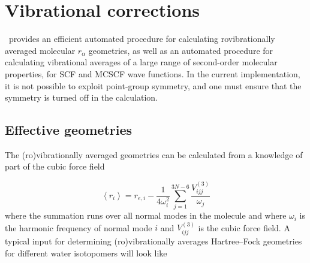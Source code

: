 \chapter{Vibrational corrections}\label{ch:vibave}

\siraba\ provides an efficient automated procedure for calculating
rovibrationally averaged molecular $r_\alpha$ geometries, as well as an
automated procedure for calculating vibrational averages of a large
range of second-order molecular properties, for SCF and MCSCF wave
functions. In the current implementation, it is not possible to
exploit point-group symmetry, and one must ensure that the symmetry is
turned off in the calculation.

\begin{center}
\end{center}

\section{Effective geometries}\label{sec:effgeom}

The (ro)vibrationally averaged geometries can be
calculated from a knowledge of part of the cubic force field

\begin{equation}
\left<r_i\right> = r_{e,i} -
\frac{1}{4\omega_i^2}\sum_{j=1}^{3N-6}\frac{V^{\left(3\right)}_{ijj}}{\omega_j}
\end{equation}
where the summation runs over all normal modes in the molecule and
where $\omega_i$ is the harmonic frequency of normal mode $i$ and
$V^{\left(3\right)}_{ijj}$ is the cubic force field. A typical input
for determining (ro)vibrationally averages Hartree--Fock geometries
for different water isotopomers will look like

